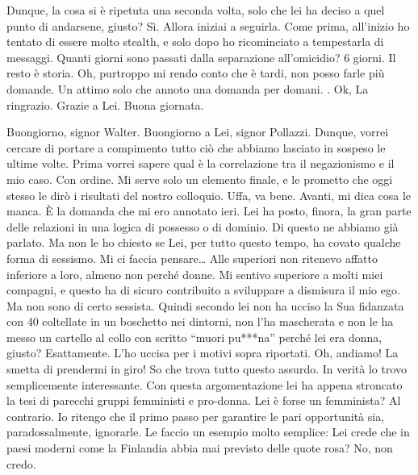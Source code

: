 \documentclass[a4paper,12pt]{article}
\newcommand{\Walter}{\speak{W}}
\newcommand{\Pollazzi}{\speak{P}}
\begin{document}
\begin{dialogue}
\Pollazzi Dunque, la cosa si è ripetuta una seconda volta, solo che lei ha deciso a quel punto di andarsene, giusto?
\Walter  Sì. Allora iniziai a seguirla. Come prima, all'inizio ho tentato di essere molto stealth, e solo dopo ho ricominciato a tempestarla di messaggi.
\Pollazzi Quanti giorni sono passati dalla separazione all'omicidio?
\Walter  6 giorni.
\Pollazzi Il resto è storia. Oh, purtroppo mi rendo conto che è tardi, non posso farle più domande. Un attimo solo che annoto una domanda per domani. . Ok, La ringrazio.
\Walter  Grazie a Lei. Buona giornata.
\end{dialogue}

\pagebreak

\begin{dialogue}
 \Pollazzi Buongiorno, signor Walter.
\Walter  Buongiorno a Lei, signor Pollazzi.
\Pollazzi Dunque, vorrei cercare di portare a compimento tutto ciò che abbiamo lasciato in sospeso le ultime volte.
\Walter  Prima vorrei sapere qual è la correlazione tra il negazionismo e il mio caso.
\Pollazzi Con ordine. Mi serve solo un elemento finale, e le prometto che oggi stesso le dirò i risultati del nostro colloquio.
\Walter  Uffa, va bene. Avanti, mi dica cosa le manca.
\Pollazzi È la domanda che mi ero annotato ieri. Lei ha posto, finora, la gran parte delle relazioni in una logica di possesso o di dominio. Di questo ne abbiamo già parlato. Ma non le ho chiesto se Lei, per tutto questo tempo, ha covato qualche forma di sessismo.
\Walter  Mi ci faccia pensare… Alle superiori non ritenevo affatto inferiore a loro, almeno non perché donne. Mi sentivo superiore a molti miei compagni, e questo ha di sicuro contribuito a sviluppare a dismisura il mio ego. Ma non sono di certo sessista.
\Pollazzi Quindi secondo lei non ha ucciso la Sua fidanzata con 40 coltellate in un boschetto nei dintorni, non l’ha mascherata e non le ha messo un cartello al collo con scritto “muori pu***na” perché lei era donna, giusto?
\Walter  Esattamente. L’ho uccisa per i motivi sopra riportati. Oh, andiamo! La smetta di prendermi in giro! So che trova tutto questo assurdo.
\Pollazzi In verità lo trovo semplicemente interessante. Con questa argomentazione lei ha appena stroncato la tesi di parecchi gruppi femministi e pro-donna.
\Walter  Lei è forse un femminista?
\Pollazzi Al contrario. Io ritengo che il primo passo per garantire le pari
opportunità sia, paradossalmente, ignorarle. Le faccio un esempio molto semplice: Lei crede che in paesi moderni come la Finlandia abbia mai previsto delle quote rosa?
\Walter  No, non credo.

\end{dialogue}
\end{document}
